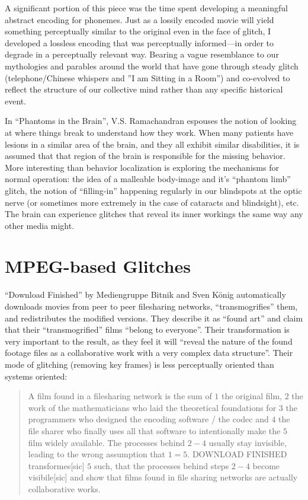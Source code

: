 \documentclass{thesis}
\begin{document}
	A significant portion of this piece was the time spent developing a meaningful abstract encoding for phonemes. Just as a lossily encoded movie will yield something perceptually similar to the original even in the face of glitch, I developed a lossless encoding that was perceptually informed---in order to degrade in a perceptually relevant way. Bearing a vague resemblance to our mythologies and parables around the world that have gone through steady glitch (telephone/Chinese whispers and ''I am Sitting in a Room'') and co-evolved to reflect the structure of our collective mind rather than any specific historical event.

	In ``Phantoms in the Brain''\cite{ramachandran_phantoms_1999}, V.S. Ramachandran espouses the notion of looking at where things break to understand how they work. When many patients have lesions in a similar area of the brain, and they all exhibit similar disabilities, it is assumed that that region of the brain is responsible for the missing behavior. More interesting than behavior localization is exploring the mechanisms for normal operation: the idea of a malleable body-image and it's ``phantom limb'' glitch, the notion of ``filling-in'' happening regularly in our blindspots at the optic nerve (or sometimes more extremely in the case of cataracts and blindsight), etc. The brain can experience glitches that reveal its inner workings the same way any other media might.
	
\section{MPEG-based Glitches}
	``Download Finished'' by Mediengruppe Bitnik and Sven K\"onig\cite{!mediengruppe_bitnik_and_sven_knig_download_????} automatically downloads movies from peer to peer filesharing networks, ``transmogrifies'' them, and redistributes the modified versions. They describe it as ``found art'' and claim that their ``transmogrified'' films ``belong to everyone''. Their transformation is very important to the result, as they feel it will ``reveal the nature of the found footage files as a collaborative work with a very complex data structure''. Their mode of glitching (removing key frames) is less perceptually oriented than systems oriented:
	
	\begin{quote}
	A film found in a filesharing network is the sum of $1$ the original film, $2$ the work of the mathematicians who laid the theoretical foundations for $3$ the programmers who designed the encoding software / the codec and $4$ the file sharer who finally uses all that software to intentionally make the $5$ film widely available. The processes behind $2-4$ usually stay invisible, leading to the wrong assumption that $1=5$. DOWNLOAD FINISHED transformes[sic] $5$ such, that the processes behind steps $2-4$ become visibile[sic] and show that films found in file sharing networks are actually collaborative works.
	\end{quote}
	
\end{document}
